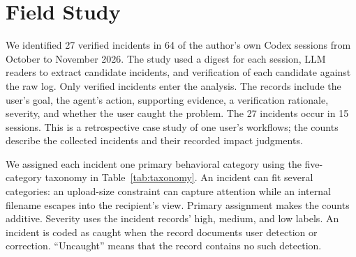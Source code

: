 \section{Field Study}
\label{sec:fieldstudy}

We identified 27 verified incidents in 64 of the author's own Codex sessions from October to November 2026. The study used a digest for each session, LLM readers to extract candidate incidents, and verification of each candidate against the raw log. Only verified incidents enter the analysis. The records include the user's goal, the agent's action, supporting evidence, a verification rationale, severity, and whether the user caught the problem. The 27 incidents occur in 15 sessions. This is a retrospective case study of one user's workflows; the counts describe the collected incidents and their recorded impact judgments.

We assigned each incident one primary behavioral category using the five-category taxonomy in Table~\ref{tab:taxonomy}. An incident can fit several categories: an upload-size constraint can capture attention while an internal filename escapes into the recipient's view. Primary assignment makes the counts additive. Severity uses the incident records' high, medium, and low labels. An incident is coded as caught when the record documents user detection or correction. ``Uncaught'' means that the record contains no such detection.

